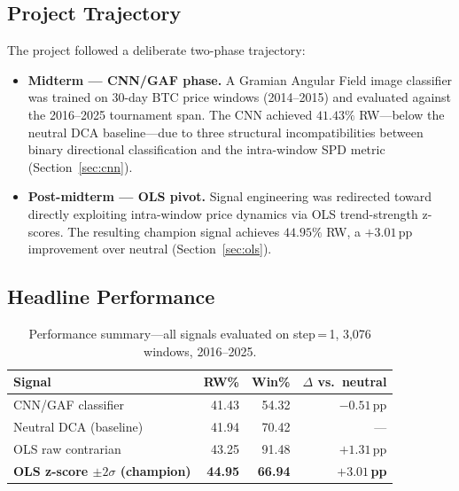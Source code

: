 \documentclass[11pt,letterpaper]{article}
\begin{document}
\subsection{Project Trajectory}

The project followed a deliberate two-phase trajectory:

\begin{itemize}
  \item \textbf{Midterm --- CNN/GAF phase.}  A Gramian Angular Field image
    classifier was trained on 30-day BTC price windows (2014--2015) and evaluated
    against the 2016--2025 tournament span.  The CNN achieved $41.43\%$ RW---below
    the neutral DCA baseline---due to three structural incompatibilities between
    binary directional classification and the intra-window SPD metric
    (Section~\ref{sec:cnn}).

  \item \textbf{Post-midterm --- OLS pivot.}  Signal engineering was redirected
    toward directly exploiting intra-window price dynamics via OLS trend-strength
    z-scores.  The resulting champion signal achieves $44.95\%$ RW, a
    $+3.01$\,pp improvement over neutral (Section~\ref{sec:ols}).
\end{itemize}

\subsection{Headline Performance}

\begin{table}[H]
  \centering
  \caption{Performance summary---all signals evaluated on step\,=\,1, 3,076
           windows, 2016--2025.}
  \label{tab:headline}
  \begin{tabular}{lrrr}
    \toprule
    \textbf{Signal} & \textbf{RW\%} & \textbf{Win\%} &
    \textbf{$\Delta$ vs.\ neutral} \\
    \midrule
    CNN/GAF classifier        & 41.43 & 54.32 & $-0.51$\,pp \\
    Neutral DCA (baseline)    & 41.94 & 70.42 & ---          \\
    OLS raw contrarian        & 43.25 & 91.48 & $+1.31$\,pp  \\
    \textbf{OLS z-score $\pm2\sigma$ (champion)}
                              & \textbf{44.95} & \textbf{66.94}
                              & $\mathbf{+3.01}$\,\textbf{pp} \\
    \bottomrule
  \end{tabular}
\end{table}
\end{document}
